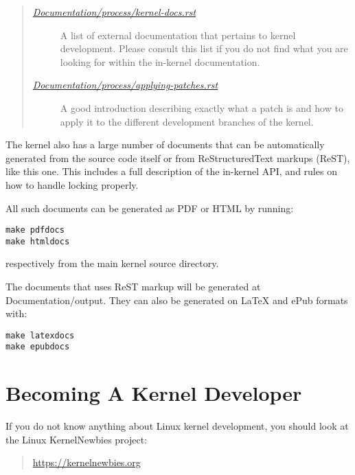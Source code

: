 \documentclass[a4paper,8pt,english]{sphinxmanual}
\begin{document}
\begin{quote}
\begin{description}
\item[{{\hyperref[process/kernel\string-docs:kernel\string-docs]{\emph{Documentation/process/kernel-docs.rst}}}}] \leavevmode
A list of external documentation that pertains to kernel
development.  Please consult this list if you do not find what you
are looking for within the in-kernel documentation.

\item[{{\hyperref[process/applying\string-patches:applying\string-patches]{\emph{Documentation/process/applying-patches.rst}}}}] \leavevmode
A good introduction describing exactly what a patch is and how to
apply it to the different development branches of the kernel.

\end{description}
\end{quote}

The kernel also has a large number of documents that can be
automatically generated from the source code itself or from
ReStructuredText markups (ReST), like this one. This includes a
full description of the in-kernel API, and rules on how to handle
locking properly.

All such documents can be generated as PDF or HTML by running:

\begin{Verbatim}[commandchars=\\\{\}]
make pdfdocs
make htmldocs
\end{Verbatim}

respectively from the main kernel source directory.

The documents that uses ReST markup will be generated at Documentation/output.
They can also be generated on LaTeX and ePub formats with:

\begin{Verbatim}[commandchars=\\\{\}]
make latexdocs
make epubdocs
\end{Verbatim}


\section{Becoming A Kernel Developer}
\label{process/howto:becoming-a-kernel-developer}
If you do not know anything about Linux kernel development, you should
look at the Linux KernelNewbies project:
\begin{quote}

\href{https://kernelnewbies.org}{https://kernelnewbies.org}
\end{quote}
\end{document}

